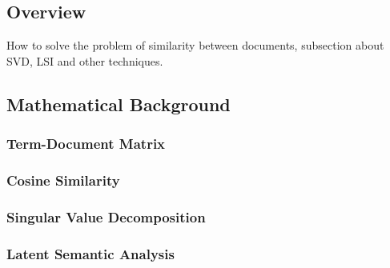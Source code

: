\subsection{Overview}

How to solve the problem of similarity between documents, subsection about SVD, LSI and other techniques.

\subsection{Mathematical Background}

\subsubsection{Term-Document Matrix}

\subsubsection{Cosine Similarity}

\subsubsection{Singular Value Decomposition}

\subsubsection{Latent Semantic Analysis}